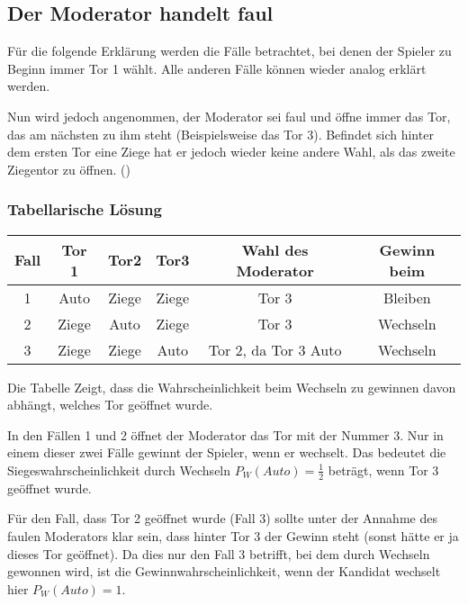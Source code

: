 
\subsection{Der Moderator handelt faul}

Für die folgende Erklärung werden die Fälle betrachtet, bei denen der Spieler zu Beginn immer Tor 1 wählt. Alle anderen Fälle können wieder analog erklärt werden.

Nun wird jedoch angenommen, der Moderator sei faul und öffne immer das Tor, das am nächsten zu ihm steht (Beispielsweise das Tor 3). Befindet sich hinter dem ersten Tor eine Ziege hat er jedoch wieder keine andere Wahl, als das zweite Ziegentor zu öffnen. (\cite{Rosenthal:2008})

\subsubsection{Tabellarische Lösung} \label{subsubsec:table_faul}

\begin{tabular}[h]{|c|c|c|c|c|c|}
    \hline
    \textbf{Fall} & \textbf{Tor 1} & \textbf{Tor2} & \textbf{Tor3} & \textbf{Wahl des Moderator} & \textbf{Gewinn beim} \\
    \hline
    1             & Auto           & Ziege         & Ziege         & Tor 3                       & Bleiben              \\
    2             & Ziege          & Auto          & Ziege         & Tor 3                       & Wechseln             \\
    3             & Ziege          & Ziege         & Auto          & Tor 2, da Tor 3 Auto        & Wechseln             \\
    \hline
\end{tabular}

Die Tabelle Zeigt, dass die Wahrscheinlichkeit beim Wechseln zu gewinnen davon abhängt, welches Tor geöffnet wurde.

In den Fällen 1 und 2 öffnet der Moderator das Tor mit der Nummer 3. Nur in einem dieser zwei Fälle gewinnt der Spieler, wenn er wechselt. Das bedeutet die Siegeswahrscheinlichkeit durch Wechseln $P_W(Auto) = \frac{1}{2}$ beträgt, wenn Tor 3 geöffnet wurde.

Für den Fall, dass Tor 2 geöffnet wurde (Fall 3) sollte unter der Annahme des faulen Moderators klar sein, dass hinter Tor 3 der Gewinn steht (sonst hätte er ja dieses Tor geöffnet). Da dies nur den Fall 3 betrifft, bei dem durch Wechseln gewonnen wird, ist die Gewinnwahrscheinlichkeit, wenn der Kandidat wechselt hier $P_W(Auto) = 1$.

